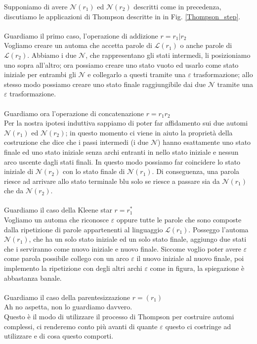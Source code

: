 \documentclass[class=book, crop=false, oneside, 12pt]{standalone}
\begin{document}
Supponiamo di avere \(\mathcal{N}(r_1)\) ed \(\mathcal{N}(r_2)\) descritti come in precedenza, discutiamo le applicazioni di Thompson descritte in in Fig. \ref{Thompson_step}.
\\\\
\noindent Guardiamo il primo caso, l'operazione di addizione \(r = r_1|r_2\)\\
Vogliamo creare un automa che accetta parole di \(\mathcal{L}(r_1)\) o anche parole di \(\mathcal{L}(r_2)\).
Abbiamo i due \(\mathcal{N}\), che rappresentano gli stati intermedi, li posizioniamo uno sopra all’altro; ora possiamo creare uno stato vuoto ed usarlo come stato iniziale per entrambi gli \(\mathcal{N}\) e collegarlo a questi tramite una \(\varepsilon\) trasformazione; allo stesso modo possiamo creare uno stato finale raggiungibile dai due \(\mathcal{N}\) tramite una \(\varepsilon\) trasformazione.
\\\\
\noindent Guardiamo ora l’operazione di concatenazione \(r = r_1 r_2\)\\
Per la nostra ipotesi induttiva sappiamo di poter far affidamento sui due automi \(\mathcal{N}(r_1)\) ed \(\mathcal{N}(r_2)\); in questo momento ci viene in aiuto la proprietà della costruzione che dice che i passi intermedi (i due \(\mathcal{N}\)) hanno esattamente uno stato finale ed uno stato iniziale senza archi entranti in nello stato iniziale e nessun arco uscente dagli stati finali. 
In questo modo possiamo far coincidere lo stato iniziale di \(\mathcal{N}(r_2)\) con lo stato finale di \(\mathcal{N}(r_1)\). 
Di conseguenza, una parola riesce ad arrivare allo stato terminale blu solo se riesce a passare sia da \(\mathcal{N}(r_1)\) che da \(\mathcal{N}(r_2)\).
\\\\
\noindent Guardiamo il caso della Kleene star \(r = r_1^*\)\\
Vogliamo un automa che riconosce \(\varepsilon\) oppure tutte le parole che sono composte dalla ripetizione di parole appartenenti al linguaggio \(\mathcal{L}(r_1)\).
Posseggo l’automa \(\mathcal{N}(r_1)\), che ha un solo stato iniziale ed un solo stato finale, aggiungo due stati che i serviranno come nuovo iniziale e nuovo finale.
Siccome voglio poter avere \(\varepsilon\) come parola possibile collego con un arco \(\varepsilon\) il nuovo iniziale al nuovo finale, poi implemento la ripetizione con degli altri archi \(\varepsilon\) come in figura, la spiegazione è abbastanza banale.
\\\\
\noindent Guardiamo il caso della parentesizzazione \(r = ( r_1 )\)\\
Ah no aspetta, non lo guardiamo davvero.
\\
Questo è il modo di utilizzare il processo di Thompson per costruire automi complessi, ci renderemo conto più avanti di quante \(\varepsilon\) questo ci costringe ad utilizzare e di cosa questo comporti.
\end{document}
